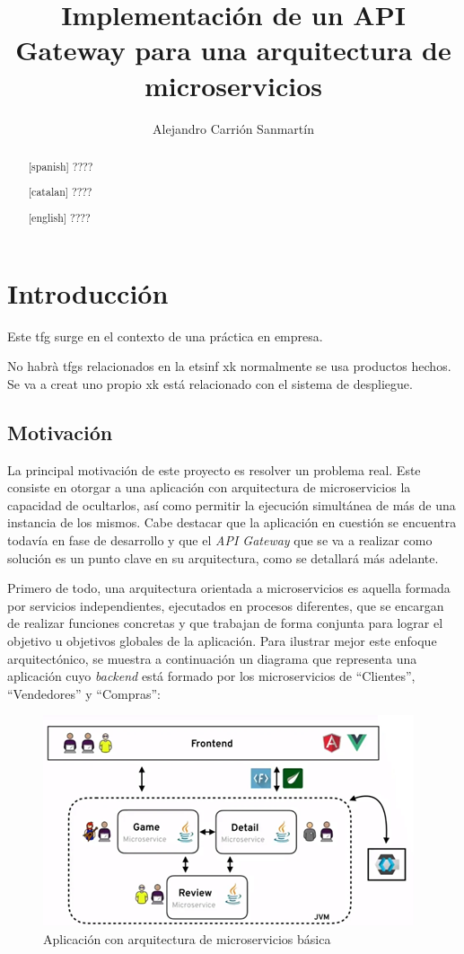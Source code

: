 \documentclass[11pt,spanish,listoffigures]{tfgetsinf}
\title{Implementación de un API Gateway para una arquitectura de microservicios}
\author{Alejandro Carrión Sanmartín}
\begin{document}

\begin{abstract}[spanish]
????
\end{abstract}
\begin{abstract}[catalan]
????
\end{abstract}
\begin{abstract}[english]
????
\end{abstract}

\mainmatter


\chapter{Introducción}

Este tfg surge en el contexto de una práctica en empresa.

No habrà tfgs relacionados en la etsinf xk normalmente se usa productos hechos. Se va a creat uno propio xk está relacionado con el sistema de despliegue.

\section{Motivación}

La principal motivación de este proyecto es resolver un problema real. Este consiste en otorgar a una aplicación con arquitectura de microservicios la capacidad de ocultarlos, así como permitir la ejecución simultánea de más de una instancia de los mismos. Cabe destacar que la aplicación en cuestión se encuentra todavía en fase de desarrollo y que el \emph{API Gateway} que se va a realizar como solución es un punto clave en su arquitectura, como se detallará más adelante.

Primero de todo, una arquitectura orientada a microservicios es aquella formada por servicios independientes, ejecutados en procesos diferentes, que se encargan de realizar funciones concretas y que trabajan de forma conjunta para lograr el objetivo u objetivos globales de la aplicación. Para ilustrar mejor este enfoque arquitectónico, se muestra a continuación un diagrama que representa una aplicación cuyo \emph{backend} está formado por los microservicios de “Clientes”, “Vendedores” y “Compras”:

\begin{figure}
	\centering
	\includegraphics{images/arquitecturaMicroserviciosBasica}
	\caption{Aplicación con arquitectura de microservicios básica}
\end{figure}
\end{document}
